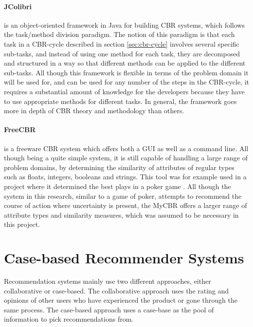 \paragraph{JColibri}
is an object-oriented framework in Java for building CBR systems, which follows the task/method division paradigm.\cite{bello2004jcolibri} The notion of this paradigm is that each task in a CBR-cycle described in section \ref{sec:cbr-cycle} involves several specific sub-tasks, and instead of using one method for each task, they are decomposed and structured in a way so that different methods can be applied to the different sub-tasks. All though this framework is flexible in terms of the problem domain it will be used for, and can be used for any number of the steps in the CBR-cycle, it requires a substantial amount of knowledge for the developers because they have to use appropriate methods for different tasks. In general, the framework goes more in depth of CBR theory and methodology than others.

\paragraph{FreeCBR}
is a freeware CBR system which offers both a GUI as well as a command line. All though being a quite simple system, it is still capable of handling a large range of problem domains, by determining the similarity of attributes of regular types such as floats, integers, booleans and strings. This tool was for example used in a project where it determined the best plays in a poker game \cite{sandven2006case}. All though the system in this research, similar to a game of poker, attempts to recommend the course of action where uncertainty is present, the MyCBR offers a larger range of attribute types and similarity measures, which was assumed to be necessary in this project.


\section{Case-based Recommender Systems}\label{sec:case_based_recommender_systems}

Recommendation systems mainly use two different approaches, either collaborative or case-based. The collaborative approach uses the rating and opinions of other users who have experienced the product or gone through the same process. The case-based approach uses a case-base as the pool of information to pick recommendations from.

